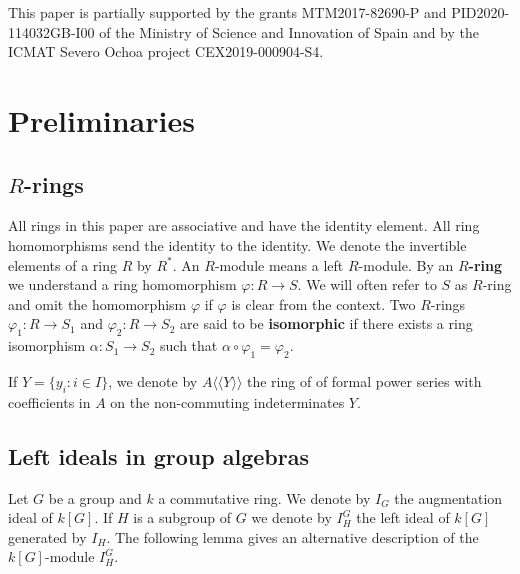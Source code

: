 \documentclass[11pt]{amsart}
\numberwithin{claimcounter}{lem}
\begin{document}
This paper is partially supported by the grants   MTM2017-82690-P and PID2020-114032GB-I00 of the Ministry of Science and Innovation of Spain  and by the ICMAT Severo
Ochoa project  CEX2019-000904-S4. 



 \section{Preliminaries}\label{prelim}  
\subsection{$R$-rings}
All rings in this paper are associative   and  have the identity element.  All   ring homomorphisms send  the identity   to the identity. We denote the invertible elements of  a ring $R$ by $R^*$. An $R$-module   means a left $R$-module.
By an {\bf $R$-ring} we understand a  ring homomorphism $\varphi: R\to S$. We will often refer to $S$ as $R$-ring and omit the homomorphism $\varphi$ if $\varphi$ is clear from the context.
Two $R$-rings $\varphi_1:R\to S_1$ and $\varphi_2:R\to S_2$ are said to be {\bf isomorphic} if there exists a ring isomorphism $\alpha: S_1\to S_2$ such that $\alpha\circ \varphi_1=\varphi_2$.

If $Y=\{y_i\colon i\in I\}$, we denote by   $A\langle \! \langle  Y\rangle \! \rangle $ the ring of   of formal
power series with coefficients in $A$ on the non-commuting  indeterminates $Y$. 
\subsection{Left ideals in  group algebras}

Let $G$ be a group and $k$ a commutative ring. We denote by $I_G$ the augmentation ideal of $k[G]$. If $H$ is a subgroup of $G$ we denote by $I_H^G$ the left ideal of $k[G]$ generated by $I_H$. The following lemma gives an alternative description of the $k[G]$-module $I_H^G$.
\end{document}
